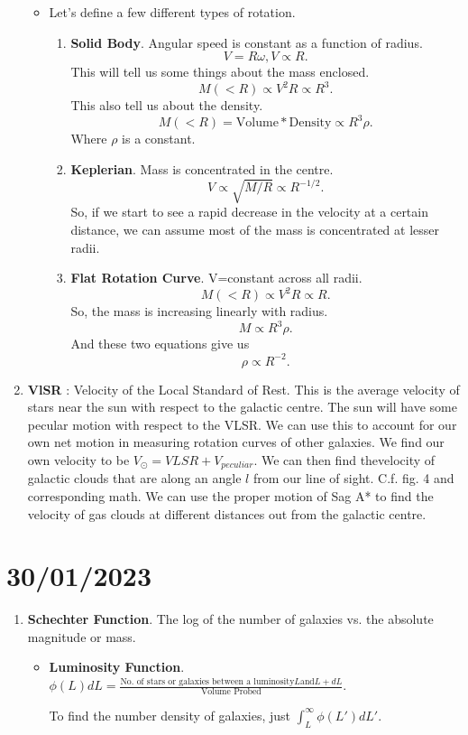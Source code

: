 \documentclass[a4paper]{article}
\begin{document}
\begin{enumerate}
\begin{itemize}
  \item Let's define a few different types of rotation.
    \begin{enumerate}
      \item {\bf Solid Body}. Angular speed is constant as a function of radius. \[
      V=R\omega, V\propto R
      .\] This will tell us some things about the mass enclosed.\[
      M(<R)\propto V^{2}R\propto R^{3}
      .\] This also tell us about the density.\[
      M(<R)=\text{Volume}*\text{Density}\propto R^{3}\rho
      .\] Where $\rho$ is a constant.
    \item {\bf Keplerian}. Mass is concentrated in the centre.\[
        V\propto\sqrt{M/R}\propto R^{-1/2}
    .\] So, if we start to see a rapid decrease in the velocity at a certain distance, we can assume most of the mass is concentrated at lesser radii.
  \item {\bf Flat Rotation Curve}. V=constant across all radii.\[
  M(<R)\propto V^{2}R \propto R
  .\] So, the mass is increasing linearly with radius. \[
  M \propto R^{3}\rho
  .\] And these two equations give us \[
  \rho \propto R^{-2}
  .\] 
    \end{enumerate}
\end{itemize}
\item {\bf VlSR} : Velocity of the Local Standard of Rest. This is the average velocity of stars near the sun with respect to the galactic centre. The sun will have some pecular motion with respect to the VLSR. We can use this to account for our own net motion in measuring rotation curves of other galaxies.
  We find our own velocity to be $V_{\odot}=VLSR+V_{peculiar}$. We can then find thevelocity of galactic clouds that are along an angle $l$ from our line of sight. C.f. fig. 4 and corresponding math.
  We can use the proper motion of Sag A* to find the velocity of gas clouds at different distances out from the galactic centre.
\end{enumerate}
\section{30/01/2023}
\begin{enumerate}
  \item {\bf Schechter Function}. The log of the number of galaxies vs. the absolute magnitude or mass.
    \begin{itemize}
      \item {\bf Luminosity Function}. $\phi(L)dL=\frac{\text{No. of stars or galaxies between a luminosity} L \text{and} L+dL}{\text{Volume Probed}}$. 

        To find the number density of galaxies, just $\int_{L}^{\infty}\phi(L')dL'$. 
    \end{itemize}
\end{enumerate}
\end{document}

